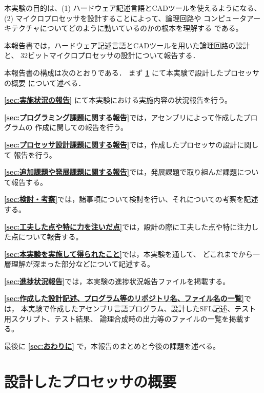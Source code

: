 \documentclass{jarticle}[11pt]
\begin{document}
本実験の目的は、(1) ハードウェア記述言語とCADツールを使えるようになる、
(2) マイクロプロセッサを設計することによって、論理回路や
コンピュータアーキテクチャについてどのように動いているのかの根本を理解する である。

本報告書では，ハードウェア記述言語とCADツールを用いた論理回路の設計と、
32ビットマイクロプロセッサの設計について報告する．



本報告書の構成は次のとおりである．
まず 
{\bf \ref{sec:設計したプロセッサの概要}} にて本実験で設計したプロセッサの概要
について述べる．

{\bf \ref{sec:実施状況の報告}} にて本実験における実施内容の状況報告を行う。

{\bf \ref{sec:プログラミング課題に関する報告}}では，アセンブリによって作成したプログラムの
作成に関しての報告を行う。

{\bf \ref{sec:プロセッサ設計課題に関する報告}}では，作成したプロセッサの設計に関して
報告を行う。

{\bf \ref{sec:追加課題や発展課題に関する報告}}では，発展課題で取り組んだ課題について報告する。

{\bf \ref{sec:検討・考察}}では，諸事項について検討を行い、それについての考察を記述する。

{\bf \ref{sec:工夫した点や特に力を注いだ点}}では，設計の際に工夫した点や特に注力した点について報告する。

{\bf \ref{sec:本実験を実施して得られたこと}}では，本実験を通して、
どこれまでから一層理解が深まった部分などについて記述する。

{\bf \ref{sec:進捗状況報告}}では，本実験の進捗状況報告ファイルを掲載する。

{\bf \ref{sec:作成した設計記述、プログラム等のリポジトリ名、ファイル名の一覧}}では，
本実験で作成したアセンブリ言語プログラム、設計したSFL記述、テスト用スクリプト、テスト結果、
論理合成時の出力等のファイルの一覧を掲載する。

最後に {\bf \ref{sec:おわりに}} で，本報告のまとめと今後の課題を述べる。




\section{設計したプロセッサの概要}
\label{sec:設計したプロセッサの概要}
\end{document}

